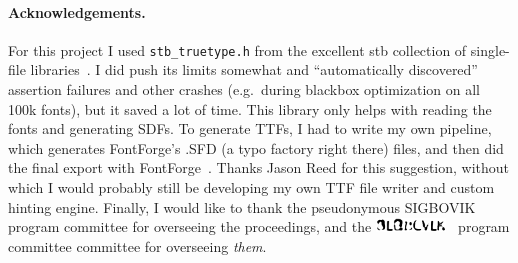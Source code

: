 \documentclass[twocolumn]{article}
\newcommand\upsigbovik{
  \includegraphics[height=1em]{upsigbovik}
}
\begin{document}
\paragraph{Acknowledgements.}
For this project I used \verb+stb_truetype.h+ from the excellent stb
collection of single-file libraries~\cite{stb}. I did push its limits
somewhat and ``automatically discovered'' assertion failures and other
crashes (e.g.~during blackbox optimization on all 100k fonts), but it
saved a lot of time. This library only helps with reading the fonts
and generating SDFs. To generate TTFs, I had to write my own pipeline,
which generates FontForge's .SFD (a typo factory right there) files,
and then did the final export with FontForge~\cite{fontforge}. Thanks
Jason Reed for this suggestion, without which I would probably still
be developing my own TTF file writer and custom hinting engine. Finally,
I would like to thank the pseudonymous SIGBOVIK program committee for
overseeing the proceedings, and the \upsigbovik\ program committee
committee for overseeing {\em them}.


{}

\end{document}
